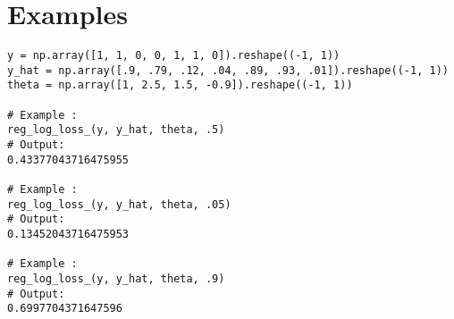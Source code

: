 
\section*{Examples}
\begin{verbatim}
y = np.array([1, 1, 0, 0, 1, 1, 0]).reshape((-1, 1))
y_hat = np.array([.9, .79, .12, .04, .89, .93, .01]).reshape((-1, 1))
theta = np.array([1, 2.5, 1.5, -0.9]).reshape((-1, 1))

# Example :
reg_log_loss_(y, y_hat, theta, .5)
# Output:
0.43377043716475955

# Example :
reg_log_loss_(y, y_hat, theta, .05)
# Output:
0.13452043716475953

# Example :
reg_log_loss_(y, y_hat, theta, .9)
# Output:
0.6997704371647596
\end{verbatim}